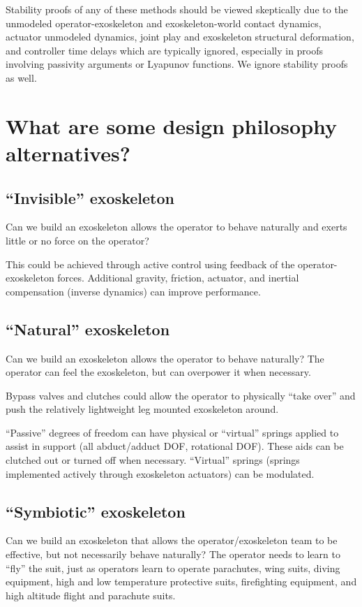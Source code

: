 \documentclass[letterpaper,12pt,fullpage]{article}
\begin{document}
Stability proofs of any of these methods should be viewed skeptically due
to the unmodeled operator-exoskeleton and exoskeleton-world contact dynamics, 
actuator unmodeled dynamics, joint play and exoskeleton
structural deformation, and controller
time delays which are typically ignored, especially in proofs involving
passivity arguments or Lyapunov functions.
We ignore stability proofs as well.

\section{What are some design philosophy alternatives?}

\subsection{``Invisible'' exoskeleton}

Can we build an exoskeleton allows the operator to behave naturally
and exerts little or no force on the operator?

This could be achieved through active control using feedback of the
operator-exoskeleton forces. Additional gravity, friction, actuator, and
inertial compensation (inverse dynamics) can improve performance.

\subsection{``Natural'' exoskeleton}

Can we build an exoskeleton allows the operator to behave naturally?
The operator can feel the exoskeleton, but can overpower it when necessary.

Bypass valves and clutches could allow the operator to physically ``take over''
and push the relatively lightweight leg mounted exoskeleton around.

``Passive'' degrees of freedom can have physical or ``virtual'' springs
applied to assist in support (all abduct/adduct DOF, rotational DOF).
These aids can be clutched out or turned off when necessary.
``Virtual'' springs (springs implemented actively through exoskeleton
actuators) can be modulated.

\subsection{``Symbiotic'' exoskeleton}

Can we build an exoskeleton that allows the operator/exoskeleton team
to be effective, but not necessarily behave naturally? 
The operator needs to learn to ``fly'' the suit,
just as operators learn to operate parachutes,
wing suits, diving equipment, high and low temperature protective
suits, firefighting equipment, and high altitude flight
and parachute suits.
\end{document}
